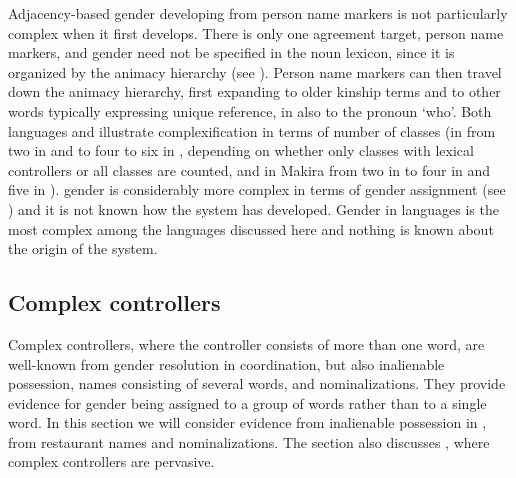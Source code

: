 \documentclass[output=collectionpaper]{langsci/langscibook}
\begin{document}
Adjacency-based gender developing from person name markers is not particularly complex when it first develops. There is only one agreement target, person name markers, and gender need not be specified in the noun lexicon, since it is organized by the animacy hierarchy (see ). Person name markers can then travel down the animacy hierarchy, first expanding to older kinship terms and to other words typically expressing unique reference, in  also to the pronoun `who'. Both  languages and  illustrate complexification in terms of number of classes (in  from two in  and  to four to six in , depending on whether only classes with lexical controllers or all classes are counted, and in Makira from two in  to four in  and five in ).  gender is considerably more complex in terms of gender assignment (see ) and it is not known how the system has developed. Gender in  languages is the most complex among the languages discussed here and nothing is known about the origin of the system.

  \subsection{Complex controllers}
\label{sec:WDG:7.3}

Complex controllers, where the controller consists of more than one word, are well-known from gender resolution in coordination, but also inalienable possession, names consisting of several words, and nominalizations. They provide evidence for gender being assigned to a group of words rather than to a single word. In this section we will consider evidence from inalienable possession in , from  restaurant names and  nominalizations. The section also discusses , where complex controllers are pervasive.
\end{document}
